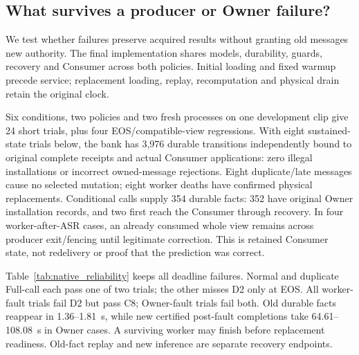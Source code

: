 \subsection{What survives a producer or Owner failure?}
\label{subsec:same_source_validation}
We test whether failures preserve acquired results without granting old
messages new authority. The final implementation shares models,
durability, guards, recovery and Consumer across both policies. Initial
loading and fixed warmup precede service; replacement loading, replay,
recomputation and physical drain retain the original clock.

Six conditions, two policies and two fresh processes on one development
clip give 24 short trials, plus four EOS/compatible-view regressions.
With eight sustained-state trials below, the bank has 3,976 durable
transitions independently bound to original complete receipts and actual
Consumer applications: zero illegal installations or incorrect
owned-message rejections. Eight duplicate/late messages cause no selected
mutation; eight worker deaths have confirmed physical replacements.
Conditional calls supply 354 durable facts: 352 have original Owner
installation records, and two first reach the Consumer through recovery.
In four worker-after-ASR cases, an already consumed whole view remains
across producer exit/fencing until legitimate correction. This is retained
Consumer state, not redelivery or proof that the prediction was correct.

\begin{table}[t]
\centering
\caption{Fault containment preserves legality, while cold recovery misses
the original service deadlines. Six short conditions use one fixed clip
and two fresh trials per policy. Each cell lists Conservative above
Full-call; ranges are observed minima/maxima. Illegal; done gives illegal
installations and completed/2 trials. Reject/mutation counts local
rejections and selected changes. New result is fault-to-actual-certified
consumption of a new fact whose call completes after the fault, excluding
old-fact replay and replacement readiness. D2/C8 counts joint whole-run
passes; EOS counts D2 misses. Both-board energy runs through physical drain.}
\label{tab:native_reliability}
\begingroup\fontsize{8.5}{10}\selectfont
\setlength{\tabcolsep}{3pt}

\endgroup
\end{table}

Table~\ref{tab:native_reliability} keeps all deadline failures. Normal and
duplicate Full-call each pass one of two trials; the other misses D2 only
at EOS. All worker-fault trials fail D2 but pass C8; Owner-fault trials
fail both. Old durable facts reappear in 1.36--1.81~s, while new certified
post-fault completions take 64.61--108.08~s in Owner cases. A surviving
worker may finish before replacement readiness. Old-fact replay and new
inference are separate recovery endpoints.

